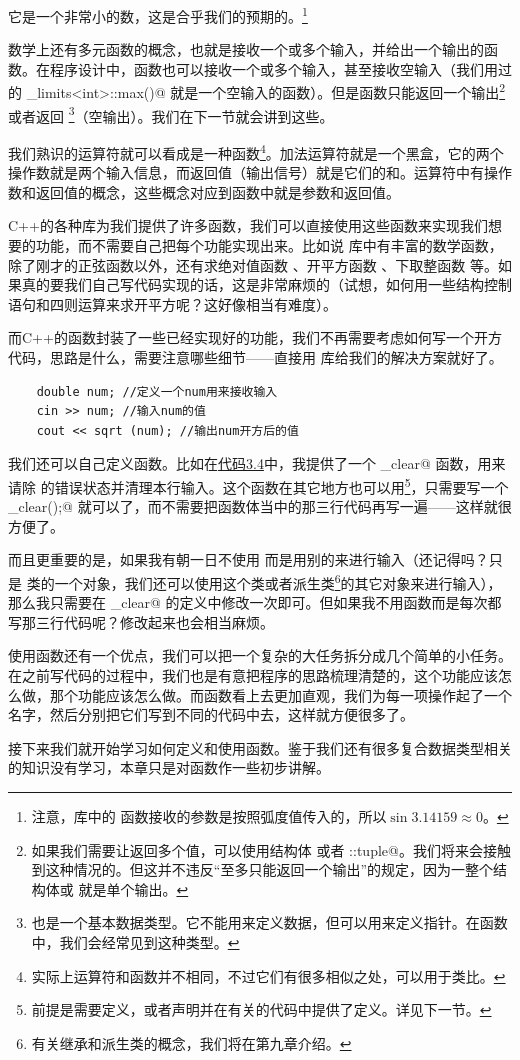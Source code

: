 它是一个非常小的数，这是合乎我们的预期的。\footnote{注意，\lstinline@cmath@ 库中的 \lstinline@sin@ 函数接收的参数是按照弧度值传入的，所以$\sin3.14159\approx0$。}\par
数学上还有多元函数的概念，也就是接收一个或多个输入，并给出一个输出的函数。在程序设计中，函数也可以接收一个或多个输入，甚至接收空输入（我们用过的 \lstinline@numeric_limits<int>::max()@ 就是一个空输入的函数）。但是函数只能返回一个输出\footnote{如果我们需要让返回多个值，可以使用结构体 \lstinline@struct@ 或者 \lstinline@std::tuple@。我们将来会接触到这种情况的。但这并不违反``至多只能返回一个输出''的规定，因为一整个结构体或 \lstinline@tuple@ 就是单个输出。}或者返回 \lstinline@void@\footnote{\lstinline@void@ 也是一个基本数据类型。它不能用来定义数据，但可以用来定义指针。在函数中，我们会经常见到这种类型。}（空输出）。我们在下一节就会讲到这些。\par
我们熟识的运算符就可以看成是一种函数\footnote{实际上运算符和函数并不相同，不过它们有很多相似之处，可以用于类比。}。加法运算符就是一个黑盒，它的两个操作数就是两个输入信息，而返回值（输出信号）就是它们的和。运算符中有操作数和返回值的概念，这些概念对应到函数中就是参数和返回值。\par
C++的各种库为我们提供了许多函数，我们可以直接使用这些函数来实现我们想要的功能，而不需要自己把每个功能实现出来。比如说 \lstinline@cmath@ 库中有丰富的数学函数，除了刚才的正弦函数以外，还有求绝对值函数 \lstinline@abs@、开平方函数 \lstinline@sqrt@、下取整函数 \lstinline@floor@ 等。如果真的要我们自己写代码实现的话，这是非常麻烦的（试想，如何用一些结构控制语句和四则运算来求开平方呢？这好像相当有难度）。\par
而C++的函数封装了一些已经实现好的功能，我们不再需要考虑如何写一个开方代码，思路是什么，需要注意哪些细节——直接用 \lstinline@cmath@ 库给我们的解决方案就好了。
\begin{lstlisting}
    double num; //定义一个num用来接收输入
    cin >> num; //输入num的值
    cout << sqrt (num); //输出num开方后的值
\end{lstlisting}\par
我们还可以自己定义函数。比如在\hyperref[lst:SumWithContinue]{代码3.4}中，我提供了一个 \lstinline@input_clear@ 函数，用来请除 \lstinline@cin@ 的错误状态并清理本行输入。这个函数在其它地方也可以用\footnote{前提是需要定义，或者声明并在有关的代码中提供了定义。详见下一节。}，只需要写一个 \lstinline@input_clear();@ 就可以了，而不需要把函数体当中的那三行代码再写一遍——这样就很方便了。\par
而且更重要的是，如果我有朝一日不使用 \lstinline@cin@ 而是用别的来进行输入（还记得吗？\lstinline@cin@ 只是 \lstinline@istream@ 类的一个对象，我们还可以使用这个类或者派生类\footnote{有关继承和派生类的概念，我们将在第九章介绍。}的其它对象来进行输入），那么我只需要在 \lstinline@input_clear@ 的定义中修改一次即可。但如果我不用函数而是每次都写那三行代码呢？修改起来也会相当麻烦。\par
使用函数还有一个优点，我们可以把一个复杂的大任务拆分成几个简单的小任务。在之前写代码的过程中，我们也是有意把程序的思路梳理清楚的，这个功能应该怎么做，那个功能应该怎么做。而函数看上去更加直观，我们为每一项操作起了一个名字，然后分别把它们写到不同的代码中去，这样就方便很多了。\par
接下来我们就开始学习如何定义和使用函数。鉴于我们还有很多复合数据类型相关的知识没有学习，本章只是对函数作一些初步讲解。\par
